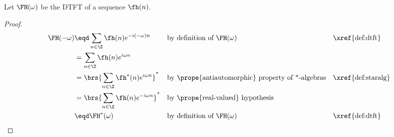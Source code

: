 \begin{lemma}
\label{lem:real_FH}
Let $\FH(\omega)$ be the DTFT  of a sequence $\fh(n)$.
\end{lemma}
\begin{proof}
\begin{align*}
  \FH(-\omega)
    &\eqd \sum_{n\in\Z} \fh(n) e^{-i(-\omega)n}
    && \text{by definition of $\FH(\omega)$}  &&\text{\xref{def:dtft}}
  \\&= \sum_{n\in\Z} \fh(n) e^{i\omega n}
  \\&= \brs{\sum_{n\in\Z} \fh^\ast(n) e^{i\omega n}}^\ast
    && \text{by \prope{antiautomorphic} property of *-algebras}    && \text{\xref{def:staralg}}
  \\&= \brs{\sum_{n\in\Z} \fh(n) e^{-i\omega n}}^\ast
    && \text{by \prope{real-valued} hypothesis}
  \\&\eqd \FH^\ast(\omega)
    && \text{by definition of $\FH(\omega)$}  &&\text{\xref{def:dtft}}
\end{align*}
\end{proof}
